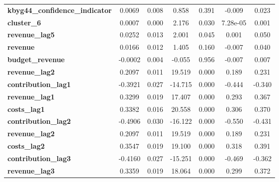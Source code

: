 \begin{center}
\begin{tabular}{lcccccc}
\textbf{kbyg44\_confidence\_indicator}      &       0.0069  &        0.008     &     0.858  &         0.391        &       -0.009    &        0.023     \\
\textbf{cluster\_6}                         &       0.0007  &        0.000     &     2.176  &         0.030        &     7.28e-05    &        0.001     \\
\textbf{revenue\_lag5}                      &       0.0252  &        0.013     &     2.001  &         0.045        &        0.001    &        0.050     \\
\textbf{revenue}                            &       0.0166  &        0.012     &     1.405  &         0.160        &       -0.007    &        0.040     \\
\textbf{budget\_revenue}                    &      -0.0002  &        0.004     &    -0.055  &         0.956        &       -0.007    &        0.007     \\
\textbf{revenue\_lag2}                      &       0.2097  &        0.011     &    19.519  &         0.000        &        0.189    &        0.231     \\
\textbf{contribution\_lag1}                 &      -0.3921  &        0.027     &   -14.715  &         0.000        &       -0.444    &       -0.340     \\
\textbf{revenue\_lag1}                      &       0.3299  &        0.019     &    17.407  &         0.000        &        0.293    &        0.367     \\
\textbf{costs\_lag1}                        &       0.3382  &        0.016     &    20.558  &         0.000        &        0.306    &        0.370     \\
\textbf{contribution\_lag2}                 &      -0.4906  &        0.030     &   -16.122  &         0.000        &       -0.550    &       -0.431     \\
\textbf{revenue\_lag2}                      &       0.2097  &        0.011     &    19.519  &         0.000        &        0.189    &        0.231     \\
\textbf{costs\_lag2}                        &       0.3547  &        0.019     &    19.100  &         0.000        &        0.318    &        0.391     \\
\textbf{contribution\_lag3}                 &      -0.4160  &        0.027     &   -15.251  &         0.000        &       -0.469    &       -0.362     \\
\textbf{revenue\_lag3}                      &       0.3359  &        0.019     &    18.064  &         0.000        &        0.299    &        0.372     \\

\end{tabular}
\end{center}
